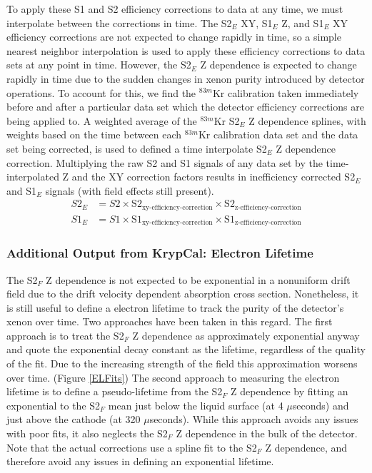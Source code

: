 \documentclass[a4paper,12pt]{article}
\begin{document}
{To apply these S1 and S2 efficiency corrections to data at any time, we must interpolate between the corrections in time.  The S2$_E$ XY, S1$_E$ Z, and S1$_E$ XY efficiency corrections are not expected to change rapidly in time, so a simple nearest neighbor interpolation is used to apply these efficiency corrections to data sets at any point in time.  However, the S2$_E$ Z dependence is expected to change rapidly in time due to the sudden changes in xenon purity introduced by detector operations.  To account for this, we find the $^{83m}$Kr calibration taken immediately before and after a particular data set which the detector efficiency corrections are being applied to.  A weighted average of the $^{83m}$Kr S2$_E$ Z dependence splines, with weights based on the time between each $^{83m}$Kr calibration data set and the data set being corrected, is used to defined a time interpolate S2$_E$ Z dependence correction.  Multiplying the raw S2 and S1 signals of any data set by the time-interpolated Z and the XY correction factors results in inefficiency corrected S2$_E$ and S1$_E$ signals (with field effects still present).
\begin{align}
S2_E &=S2 \times \mbox{S}2_{\mbox{xy-efficiency-correction}} \times \mbox{S}2_{\mbox{z-efficiency-correction}} \\
S1_E &=S1 \times \mbox{S}1_{\mbox{xy-efficiency-correction}} \times \mbox{S}1_{\mbox{z-efficiency-correction}}
\end{align}

\subsubsection{Additional Output from KrypCal: Electron Lifetime}

The S2$_F$ Z dependence is not expected to be exponential in a nonuniform drift field due to the drift velocity dependent absorption cross section.  Nonetheless, it is still useful to define a electron lifetime to track the purity of the detector's xenon over time.  Two approaches have been taken in this regard.  The first approach is to treat the S2$_F$ Z dependence as approximately exponential anyway and quote the exponential decay constant as the lifetime, regardless of the quality of the fit.  Due to the increasing strength of the field this approximation worsens over time. (Figure \ref{ELFits})  The second approach to measuring the electron lifetime is to define a pseudo-lifetime from the S2$_F$ Z dependence by fitting an exponential to the S2$_F$ mean just below the liquid surface (at 4 $\mu$seconds) and just above the cathode (at 320 $\mu$seconds).  While this approach avoids any issues with poor fits, it also neglects the S2$_F$ Z dependence in the bulk of the detector.  Note that the actual corrections use a spline fit to the S2$_F$ Z dependence, and therefore avoid any issues in defining an exponential lifetime.


}
\end{document}
